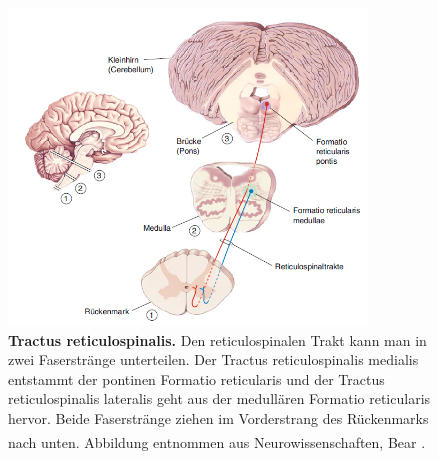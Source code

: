 \documentclass[12pt,a4paper,pdftex]{article}
\begin{document}
\begin{figure}[H]
    \centering
    \includegraphics[width=0.85\textwidth]{pictures/Bilder_Laura/reticulospinaler_tract.PNG}
    \caption[Tractus reticulospinalis]{\textbf{Tractus reticulospinalis.} Den reticulospinalen Trakt kann man in zwei Faserstränge unterteilen.  Der Tractus reticulospinalis medialis entstammt der pontinen Formatio reticularis und der Tractus reticulospinalis lateralis geht aus der medullären Formatio reticularis hervor. Beide Faserstränge ziehen im Vorderstrang des Rückenmarks nach unten. Abbildung entnommen aus Neurowissenschaften, Bear \textsuperscript{\cite[14]{neurowissenschaften_baer}}.}
    \label{fig:tr_reticulospinalis}
\end{figure}
\end{document}
